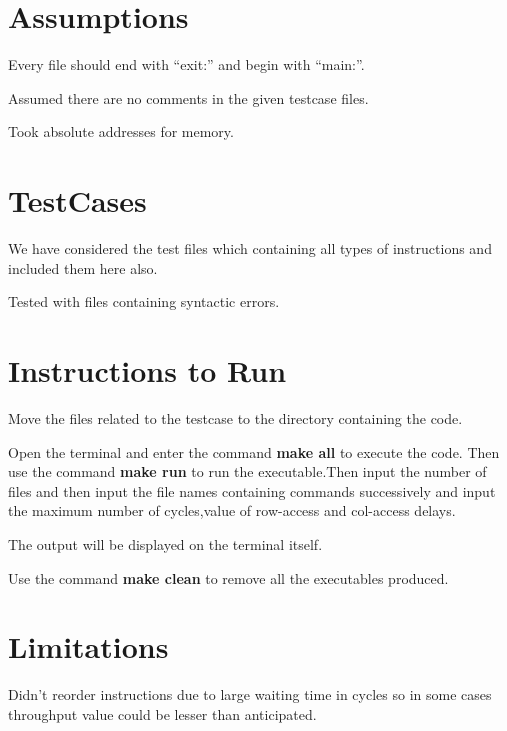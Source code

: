 \documentclass[12pt]{article}
\begin{document}
 \vspace{5mm}
   
\section{Assumptions}
\begin{itemize}
\normalsize{
\item Every file should end with “exit:” and begin with “main:”.
\item Assumed there are no comments in the given testcase files.
\item Took absolute addresses for memory.
}

\end{itemize}

\section{TestCases}
 
 \begin{itemize}
\normalsize{

\item We have considered the test files which containing all types of instructions and included them here also.
\item Tested with files containing syntactic errors.
}
\end{itemize}

\section{Instructions to Run}
\begin{itemize}
\normalsize{
\item Move the files related to the testcase to the directory containing the code.
\item Open the terminal and enter the command \textbf{make all} to execute the code. Then  use the command \textbf{make run} to run the executable.Then input the number of files and then input the file names containing commands  successively and input the maximum number of cycles,value of row-access and col-access delays.
\item The output will be displayed on the terminal itself.
\item Use the command \textbf{make clean} to remove all the executables produced.
}

\end{itemize}

\section{Limitations}
\begin{itemize}
\normalsize{
\item Didn’t reorder instructions due to large waiting time in cycles so in some cases throughput value could be lesser than anticipated.
}



 
\end{itemize}
\end{document}
